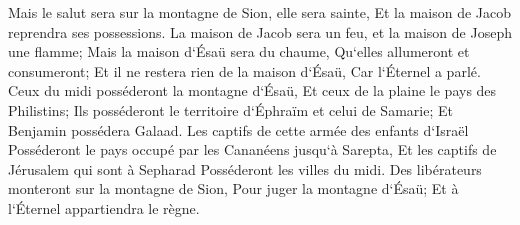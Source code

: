 \verse Mais le salut sera sur la montagne de Sion, elle sera sainte, Et la maison de Jacob reprendra ses possessions. 
\verse La maison de Jacob sera un feu, et la maison de Joseph une flamme; Mais la maison d`Ésaü sera du chaume, Qu`elles allumeront et consumeront; Et il ne restera rien de la maison d`Ésaü, Car l`Éternel a parlé. 
\verse Ceux du midi posséderont la montagne d`Ésaü, Et ceux de la plaine le pays des Philistins; Ils posséderont le territoire d`Éphraïm et celui de Samarie; Et Benjamin possédera Galaad. 
\verse Les captifs de cette armée des enfants d`Israël Posséderont le pays occupé par les Cananéens jusqu`à Sarepta, Et les captifs de Jérusalem qui sont à Sepharad Posséderont les villes du midi. 
\verse Des libérateurs monteront sur la montagne de Sion, Pour juger la montagne d`Ésaü; Et à l`Éternel appartiendra le règne. 
